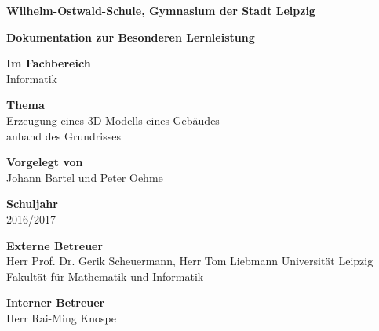 \begin{center}
	\thispagestyle{empty}
			\textbf{Wilhelm-Ostwald-Schule, Gymnasium der Stadt Leipzig}
			
			\Large
			\textbf{Dokumentation zur Besonderen Lernleistung} \break
			
			\large
			\textbf{Im Fachbereich}\\
			Informatik \break
			
			
			\textbf{Thema}\\
			Erzeugung eines 3D-Modells eines Gebäudes\\ anhand des Grundrisses \break
			
			\textbf{Vorgelegt von}\\
			Johann Bartel und Peter Oehme \break
			
			\textbf{Schuljahr}\\
			2016/2017 \break
			
			\textbf{Externe Betreuer}\\
			Herr Prof. Dr. Gerik Scheuermann, Herr Tom Liebmann \break
			Universität Leipzig
			Fakultät für Mathematik und Informatik \break
			
			\textbf{Interner Betreuer}\\
			Herr Rai-Ming Knospe \\
			
			
			\vspace{0.5cm}
			
\end{center}